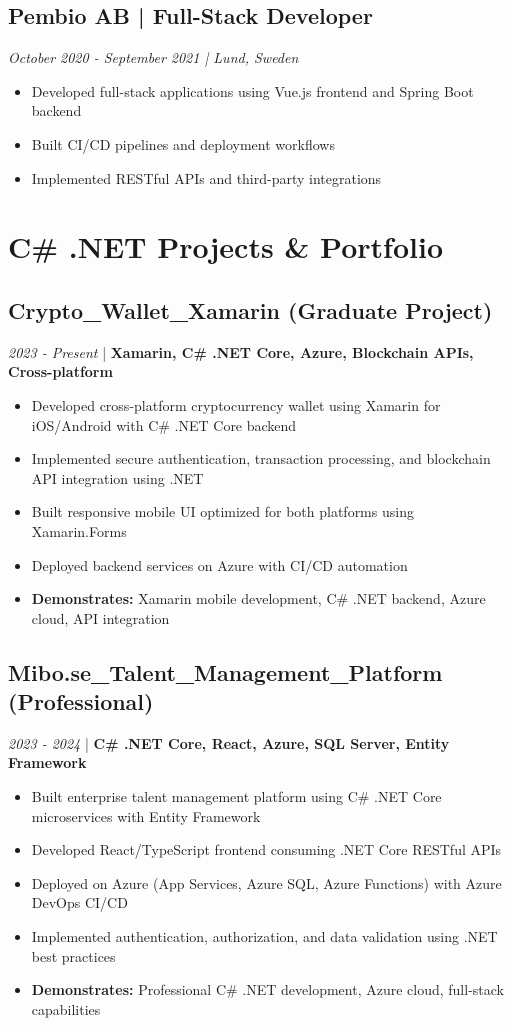 \documentclass[11pt,a4paper]{article}
\begin{document}
\subsection*{Pembio AB | Full-Stack Developer}
\textit{October 2020 - September 2021 | Lund, Sweden}
\begin{itemize}[noitemsep]
\item Developed full-stack applications using Vue.js frontend and Spring Boot backend
\item Built CI/CD pipelines and deployment workflows
\item Implemented RESTful APIs and third-party integrations
\end{itemize}

\section*{C\# .NET Projects \& Portfolio}

\subsection*{Crypto\_Wallet\_Xamarin (Graduate Project)}
\textit{2023 - Present} | \textbf{Xamarin, C\# .NET Core, Azure, Blockchain APIs, Cross-platform}
\begin{itemize}[noitemsep]
\item Developed cross-platform cryptocurrency wallet using Xamarin for iOS/Android with C\# .NET Core backend
\item Implemented secure authentication, transaction processing, and blockchain API integration using .NET
\item Built responsive mobile UI optimized for both platforms using Xamarin.Forms
\item Deployed backend services on Azure with CI/CD automation
\item \textbf{Demonstrates:} Xamarin mobile development, C\# .NET backend, Azure cloud, API integration
\end{itemize}

\subsection*{Mibo.se\_Talent\_Management\_Platform (Professional)}
\textit{2023 - 2024} | \textbf{C\# .NET Core, React, Azure, SQL Server, Entity Framework}
\begin{itemize}[noitemsep]
\item Built enterprise talent management platform using C\# .NET Core microservices with Entity Framework
\item Developed React/TypeScript frontend consuming .NET Core RESTful APIs
\item Deployed on Azure (App Services, Azure SQL, Azure Functions) with Azure DevOps CI/CD
\item Implemented authentication, authorization, and data validation using .NET best practices
\item \textbf{Demonstrates:} Professional C\# .NET development, Azure cloud, full-stack capabilities
\end{itemize}
\end{document}
